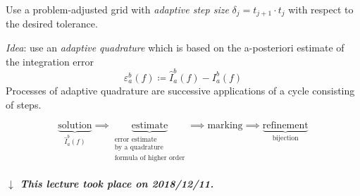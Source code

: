 \documentclass[a4paper]{article}
\numberwithin{lecref}{section}
\theoremstyle{break}
\newcommand{\dateref}[1]{%
  \begin{mdframed}[backgroundcolor=gray!10,innerbottommargin=0pt,innertopmargin=0pt]
    \paragraph{\textit{$\downarrow$ This lecture took place on #1.}}%
  \end{mdframed}%
}
\begin{document}
Use a problem-adjusted grid with \emph{adaptive step size} $\delta_j = t_{j+1} \cdot t_j$ with respect to the desired tolerance.

\emph{Idea}: use an \emph{adaptive quadrature} which is based on the a-posteriori estimate of the integration error
\[ \varepsilon_a^b(f) \coloneqq \hat{I}_a^b(f) - I_a^b(f) \]
Processes of adaptive quadrature are successive applications of a cycle consisting of steps.

\[
  \underbrace{\text{solution}}_{\hat{I}_a^b(f)}
    \implies \underbrace{\text{estimate}}_{\substack{\text{error estimate} \\ \text{by a quadrature} \\ \text{formula of higher order}}}
    \implies \text{marking}
    \implies \underbrace{\text{refinement}}_{\text{bijection}}
\]

\dateref{2018/12/11}
\end{document}
